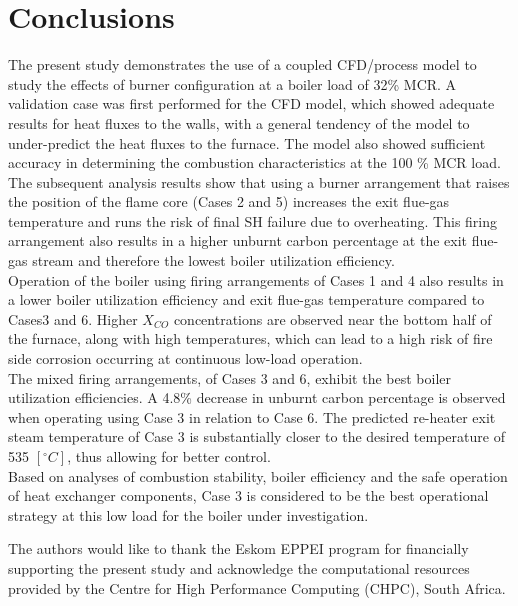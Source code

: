 \documentclass[twocolumn,10pt]{asme2ej}
\begin{document}
\section{Conclusions}
The present study demonstrates the use of a coupled CFD/process model to study the effects of burner configuration at a boiler load of 32\% MCR. A validation case was first performed for the CFD model, which showed adequate results for heat fluxes to the walls, with a general tendency of the model to under-predict the heat fluxes to the furnace. The model also showed sufficient accuracy in determining the combustion characteristics at the 100 \% MCR load.\\ 

The subsequent analysis results show that using a burner arrangement that raises the position of the flame core (Cases 2 and 5) increases the exit flue-gas temperature and runs the risk of final SH failure due to overheating. This firing arrangement also results in a higher unburnt carbon percentage at the exit flue-gas stream and therefore the lowest boiler utilization efficiency. \\

Operation of the boiler using firing arrangements of Cases 1 and 4 also results in a lower boiler utilization efficiency and exit flue-gas temperature compared to Cases3 and 6. Higher $X_{CO}$ concentrations are observed near the bottom half of the furnace, along with high temperatures, which can lead to a high risk of fire side corrosion occurring at continuous low-load operation. \\

The mixed firing arrangements, of Cases 3 and 6, exhibit the best boiler utilization efficiencies. A 4.8\% decrease in unburnt carbon percentage is observed when operating using Case 3 in relation to Case 6. The predicted re-heater exit steam temperature of Case 3 is substantially closer to the desired temperature of 535 $[^\circ C]$, thus allowing for better control.\\
\newpage
Based on analyses of combustion stability, boiler efficiency and the safe operation of heat exchanger components, Case 3 is considered to be the best operational strategy at this low load for the boiler under investigation.


\newpage
\begin{acknowledgment}
The authors would like to thank the Eskom EPPEI program for financially supporting the present study and acknowledge the computational resources provided by the Centre for High Performance Computing (CHPC), South Africa.
\end{acknowledgment}
\end{document}
